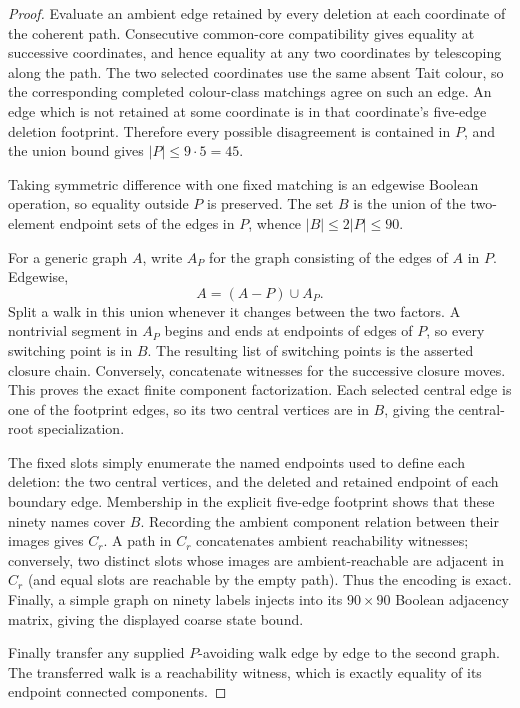 \begin{proof}
Evaluate an ambient edge retained by every deletion at each coordinate of
the coherent path.  Consecutive common-core compatibility gives equality at
successive coordinates, and hence equality at any two coordinates by
telescoping along the path.  The two selected coordinates use the same
absent Tait colour, so the corresponding completed colour-class matchings
agree on such an edge.  An edge which is not retained at some coordinate is
in that coordinate's five-edge deletion footprint.  Therefore every
possible disagreement is contained in $P$, and the union bound gives
$|P|\leq9\cdot5=45$.

Taking symmetric difference with one fixed matching is an edgewise Boolean
operation, so equality outside $P$ is preserved.  The set $B$ is the union of
the two-element endpoint sets of the edges in $P$, whence
$|B|\leq2|P|\leq90$.

For a generic graph $A$, write $A_P$ for the graph consisting of the edges of
$A$ in $P$.  Edgewise,
\[
                       A=(A-P)\cup A_P.
\]
Split a walk in this union whenever it changes between the two factors.  A
nontrivial segment in $A_P$ begins and ends at endpoints of edges of $P$, so
every switching point is in $B$.  The resulting list of switching points is
the asserted closure chain.  Conversely, concatenate witnesses for the
successive closure moves.  This proves the exact finite component
factorization.  Each selected central edge is one of the footprint edges, so
its two central vertices are in $B$, giving the central-root specialization.

The fixed slots simply enumerate the named endpoints used to define each
deletion: the two central vertices, and the deleted and retained endpoint of
each boundary edge.  Membership in the explicit five-edge footprint shows
that these ninety names cover $B$.  Recording the ambient component relation
between their images gives $C_r$.  A path in $C_r$ concatenates ambient
reachability witnesses; conversely, two distinct slots whose images are
ambient-reachable are adjacent in $C_r$ (and equal slots are reachable by the
empty path).  Thus the encoding is exact.  Finally, a simple graph on ninety
labels injects into its $90\times90$ Boolean adjacency matrix, giving the
displayed coarse state bound.

Finally transfer any supplied $P$-avoiding walk edge by edge to the second
graph.  The transferred walk is a reachability witness, which is exactly
equality of its endpoint connected components.


\end{proof}
